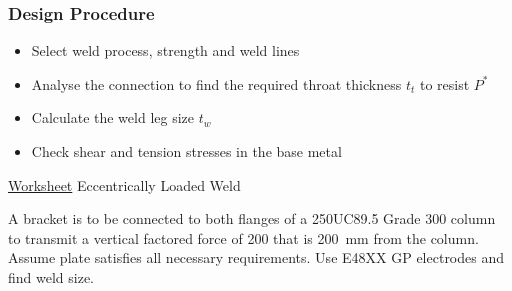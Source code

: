 \subsubsection{Design Procedure}
\begin{itemize}
\item Select weld process, strength and weld lines
\item Analyse the connection to find the required throat thickness $t_t$ to resist $P^*$
\item Calculate the weld leg size $t_w$
\item Check shear and tension stresses in the base metal
\end{itemize}
\begin{exmp}\href{run:./WORKSHEET/CH08/EX8.ECLW.sm}{Worksheet} Eccentrically Loaded Weld

A bracket is to be connected to both flanges of a 250UC89.5 Grade 300 column to transmit a vertical factored force of \SI{200}{\kn} that is \SI{200}{\mm} from the column.
Assume plate satisfies all necessary requirements.
Use E48XX GP electrodes and find weld size.
\begin{figure}[H]
\end{figure}
\end{exmp}
